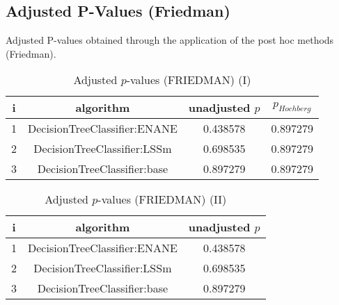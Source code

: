 \documentclass[a4paper,10pt]{article}
\begin{document}
\begin{landscape}
\section{Adjusted P-Values (Friedman)}


Adjusted P-values obtained through the application of the post hoc methods (Friedman).

\begin{table}[!htp]
\centering\small
\begin{tabular}{cccc}
i&algorithm&unadjusted $p$&$p_{Hochberg}$\\
\hline1&DecisionTreeClassifier:ENANE&0.438578&0.897279\\2&DecisionTreeClassifier:LSSm&0.698535&0.897279\\3&DecisionTreeClassifier:base&0.897279&0.897279\\\hline
\end{tabular}
\caption{Adjusted $p$-values (FRIEDMAN) (I)}
\end{table}
\begin{table}[!htp]
\centering\small
\begin{tabular}{ccc}
i&algorithm&unadjusted $p$\\
\hline1&DecisionTreeClassifier:ENANE&0.438578\\2&DecisionTreeClassifier:LSSm&0.698535\\3&DecisionTreeClassifier:base&0.897279\\\hline
\end{tabular}
\caption{Adjusted $p$-values (FRIEDMAN) (II)}
\end{table}

\newpage
\end{landscape}
\end{document}

